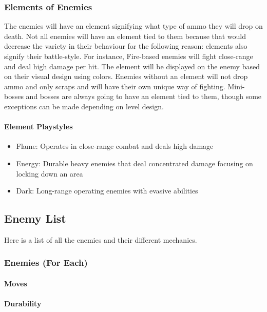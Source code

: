 \documentclass[12pt]{article}
\begin{document}
\subsubsection{Elements of Enemies}

The enemies will have an element signifying what type of ammo they will drop on death. Not all enemies will have an element tied to them because that would decrease the variety in their behaviour for the following reason: elements also signify their battle-style. For instance, Fire-based enemies will fight close-range and deal high damage per hit. The element will be displayed on the enemy based on their visual design using colors. Enemies without an element will not drop ammo and only scraps and will have their own unique way of fighting. Mini-bosses and bosses are always going to have an element tied to them, though some exceptions can be made depending on level design. 

\paragraph{Element Playstyles}

\begin{itemize}
	\item Flame: Operates in close-range combat and deals high damage
	\item Energy: Durable heavy enemies that deal concentrated damage focusing on locking down an area
	\item Dark: Long-range operating enemies with evasive abilities
\end{itemize}


\subsection{Enemy List}

Here is a list of all the enemies and their different mechanics. 

\subsubsection{Enemies (For Each)}

\paragraph{Moves}

\paragraph{Durability}
\end{document}
